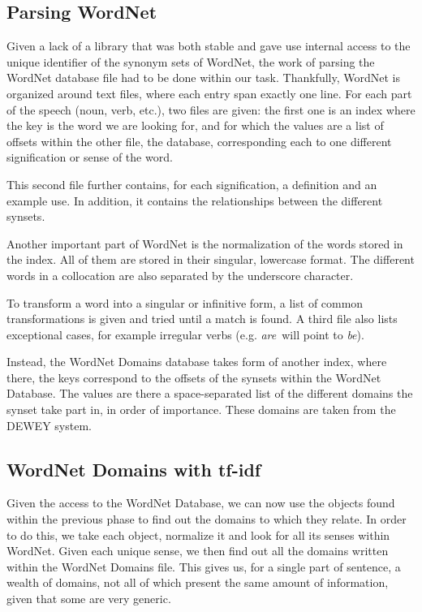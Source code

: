 \subsection{Parsing WordNet} %
\label{sub:parsing_wordnet}

Given a lack of a library that was both stable and gave use internal access to the unique identifier of the synonym sets of WordNet, the work of parsing the WordNet database file had to be done within our task. Thankfully, WordNet is organized around text files, where each entry span exactly one line. For each part of the speech (noun, verb, etc.), two files are given: the first one is an index where the key is the word we are looking for, and for which the values are a list of offsets within the other file, the database, corresponding each to one different signification or sense of the word.

This second file further contains, for each signification, a definition and an example use. In addition, it contains the relationships between the different synsets.

Another important part of WordNet is the normalization of the words stored in the index. All of them are stored in their singular, lowercase format. The different words in a collocation are also separated by the underscore character.

To transform a word into a singular or infinitive form, a list of common transformations is given and tried until a match is found. A third file also lists exceptional cases, for example irregular verbs (e.g. \emph{are}\ will point to \emph{be}).

Instead, the WordNet Domains database takes form of another index, where there, the keys correspond to the offsets of the synsets within the WordNet Database. The values are there a space-separated list of the different domains the synset take part in, in order of importance. These domains are taken from the DEWEY system.


\subsection{WordNet Domains with tf-idf} %
\label{sub:wordnet_domains_with_tf_idf}

Given the access to the WordNet Database, we can now use the objects found within the previous phase to find out the domains to which they relate. In order to do this, we take each object, normalize it and look for all its senses within WordNet. Given each unique sense, we then find out all the domains written within the WordNet Domains file. This gives us, for a single part of sentence, a wealth of domains, not all of which present the same amount of information, given that some are very generic.

